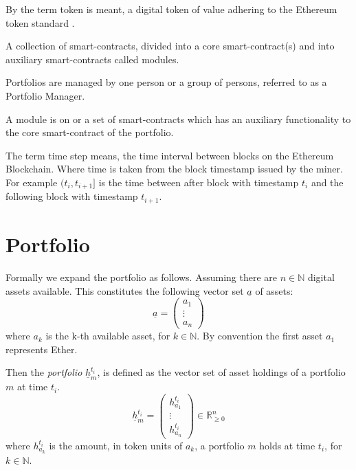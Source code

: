 \documentclass[conference]{IEEEtran}
\begin{document}
\begin{description}
	\item[Token] By the term token is meant, a digital token of value adhering to the Ethereum token standard \cite{tokenstandard}.
	\item[Portfolio] A collection of smart-contracts, divided into a core smart-contract(s) and into auxiliary smart-contracts called modules.
	\item[Portfolio Manager] Portfolios are managed by one person or a group of persons, referred to as a Portfolio Manager.
	\item[Module] A module is on or a set of smart-contracts which has an auxiliary functionality to the core smart-contract of the portfolio.
	\item[Time Step] The term time step means, the time interval between blocks on the Ethereum Blockchain. Where time is taken from the block timestamp issued by the miner. For example $(t_i, t_{i+1}]$ is the time between after block with timestamp $t_i$ and the following block with timestamp $t_{i+1}$.
\end{description}

\section{Portfolio}\label{app:defportfolio}

Formally we expand the portfolio as follows. Assuming there are $n \in \mathbb{N}$ digital assets available. This constitutes the following vector set $\underline{a}$ of assets:
\begin{equation}
\underline{a} = \begin{pmatrix}a_{1}\\ \vdots \\ a_{n}\end{pmatrix}
\end{equation}
where $a_k$ is the k-th available asset, for $k \in \mathbb{N}$.
By convention the first asset $a_1$ represents Ether.

Then the \textit{portfolio} $\underline{h}_m^{t_i}$, is defined as the vector set of asset holdings of a portfolio $m$ at time $t_i$.
\begin{equation}
\underline{h}_m^{t_i} = \begin{pmatrix}h_{a_{1}}^{t_i}\\ \vdots \\ h_{a_{n}}^{t_i}\end{pmatrix} \in \mathbb{R}_{\geq 0}^n
\end{equation}
where $h_{a_{k}}^{t_i}$ is the amount, in token units of $a_k$, a portfolio $m$ holds at time $t_i$, for $k \in \mathbb{N}$.
\end{document}
